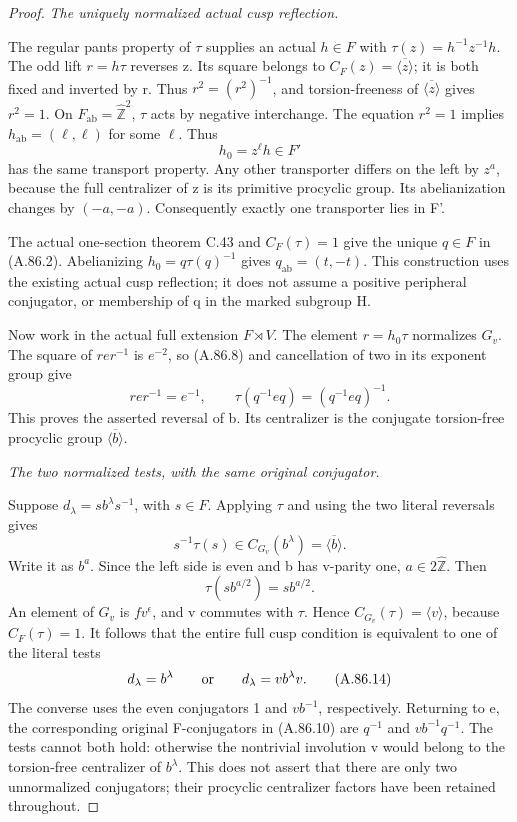 \begin{proof}
\emph{The uniquely normalized actual cusp reflection.}\par
The regular pants property of \(\tau\) supplies an actual
\(h\in F\) with \(\tau(z)=h^{-1}z^{-1}h\).
The odd lift \(r=h\tau\) reverses z. Its square belongs to
\(C_F(z)=\overline{\langle z\rangle}\); it is both fixed
and inverted by r. Thus \(r^2=(r^2)^{-1}\), and torsion-freeness
of \(\overline{\langle z\rangle}\) gives \(r^2=1\). On
\(F_{\mathrm{ab}}=\widehat{\mathbb Z}^2\), \(\tau\)
acts by negative interchange. The equation \(r^2=1\) implies
\(h_{\mathrm{ab}}=(\ell,\ell)\) for some \(\ell\).
Thus
\[
                         h_0=z^\ell h\in F'
 \tag{A.86.12}
\]
has the same transport property. Any other transporter differs on
the left by \(z^a\), because the full centralizer of z is its
primitive procyclic group. Its abelianization changes by
\((-a,-a)\). Consequently exactly one transporter lies in F'.

The actual one-section theorem C.43 and \(C_F(\tau)=1\)
give the unique \(q\in F\) in (A.86.2). Abelianizing
\(h_0=q\tau(q)^{-1}\) gives
\(q_{\mathrm{ab}}=(t,-t)\). This construction uses the
existing actual cusp reflection; it does not assume a positive
peripheral conjugator, or membership of q in the marked subgroup H.

Now work in the actual full extension \(F\rtimes V\).
The element \(r=h_0\tau\) normalizes \(G_v\).
The square of \(rer^{-1}\) is \(e^{-2}\), so (A.86.8)
and cancellation of two in its exponent group give
\[
       rer^{-1}=e^{-1},\qquad
       \tau(q^{-1}eq)=(q^{-1}eq)^{-1}.
 \tag{A.86.13}
\]
This proves the asserted reversal of b. Its centralizer is the
conjugate torsion-free procyclic group \(\overline{\langle b\rangle}\).

\emph{The two normalized tests, with the same original conjugator.}\par
Suppose \(d_\lambda=s b^\lambda s^{-1}\), with \(s\in F\).
Applying \(\tau\) and using the two literal reversals gives
\[
       s^{-1}\tau(s)\in C_{G_v}(b^\lambda)
                            =\overline{\langle b\rangle}.
\]
Write it as \(b^a\). Since the left side is even and b has
v-parity one, \(a\in2\widehat{\mathbb Z}\). Then
\[
                   \tau(sb^{a/2})=sb^{a/2}.
\]
An element of \(G_v\) is \(fv^\epsilon\), and v commutes
with \(\tau\). Hence \(C_{G_v}(\tau)=\langle v\rangle\),
because \(C_F(\tau)=1\). It follows that the entire full cusp
condition is equivalent to one of the literal tests
\[
       d_\lambda=b^\lambda
       \qquad\hbox{or}\qquad
       d_\lambda=v b^\lambda v.
 \tag{A.86.14}
\]
The converse uses the even conjugators 1 and \(vb^{-1}\),
respectively. Returning to e, the corresponding original F-conjugators
in (A.86.10) are \(q^{-1}\) and \(vb^{-1}q^{-1}\).
The tests cannot both hold: otherwise the nontrivial involution v
would belong to the torsion-free centralizer of \(b^\lambda\).
This does not assert that there are only two unnormalized conjugators;
their procyclic centralizer factors have been retained throughout.


\end{proof}

